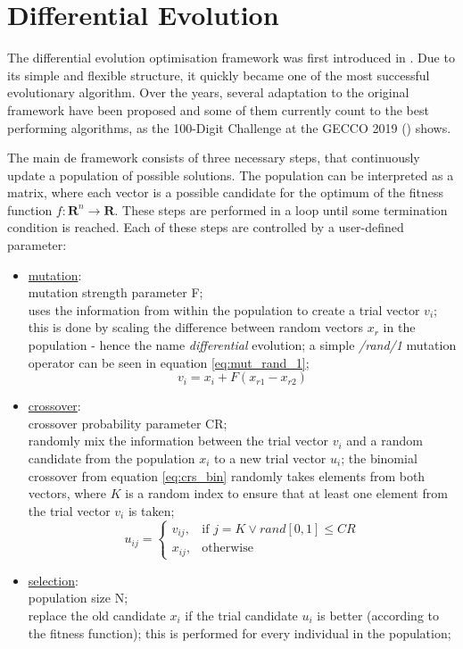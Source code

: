 \documentclass[./\jobname.tex,hidelinks]{subfiles}
\begin{document}
\section{Differential Evolution}

The differential evolution optimisation framework was first introduced in \cite{storn_differential_1997}. Due to its simple and flexible structure, it quickly became one of the most successful evolutionary algorithm. Over the years, several adaptation to the original framework have been proposed and some of them currently count to the best performing algorithms, as the 100-Digit Challenge at the GECCO 2019 (\cite{suganthan_p-n-suganthancec2019_2020}) shows. 

The main \gls{de} framework consists of three necessary steps, that continuously update a population of possible solutions. The population can be interpreted as a matrix, where each vector is a possible candidate for the optimum of the fitness function $f: \mathbf{R}^n \rightarrow \mathbf{R}$. These steps are performed in a loop until some termination condition is reached. Each of these steps are controlled by a user-defined parameter: 
\begin{itemize}
	\item \underline{mutation}: \\
		  mutation strength parameter F;\\
		  uses the information from within the population to create a trial vector $v_i$;\\
		  this is done by scaling the difference between random vectors $x_{r}$ in the population - hence the name \textit{differential} evolution; a simple \textit{/rand/1} mutation operator can be seen in equation \ref{eq:mut_rand_1};
		  \begin{equation}
		  \label{eq:mut_rand_1}
		  v_i = x_{i} + F(x_{r1} - x_{r2})
		  \end{equation}
	\item \underline{crossover}: \\
		  crossover probability parameter CR;\\
		  randomly mix the information between the trial vector $v_i$ and a random candidate from the population $x_{i}$ to a new trial vector $u_i$; the binomial crossover from equation \ref{eq:crs_bin} randomly takes elements from both vectors, where $K$ is a random index to ensure that at least one element from the trial vector $v_i$ is taken;
		  \begin{equation}
		  \label{eq:crs_bin}
		  u_{ij}=\begin{cases}
		  v_{ij}, &\text{if $j = K \lor rand[0,1] \leq CR$}\\
		  x_{ij}, &\text{otherwise}
		  \end{cases}
		  \end{equation}
	\item \underline{selection}: \\
		  population size N;\\
		  replace the old candidate $x_i$ if the trial candidate $u_i$ is better (according to the fitness function); this is performed for every individual in the population;
\end{itemize}  
\end{document}
